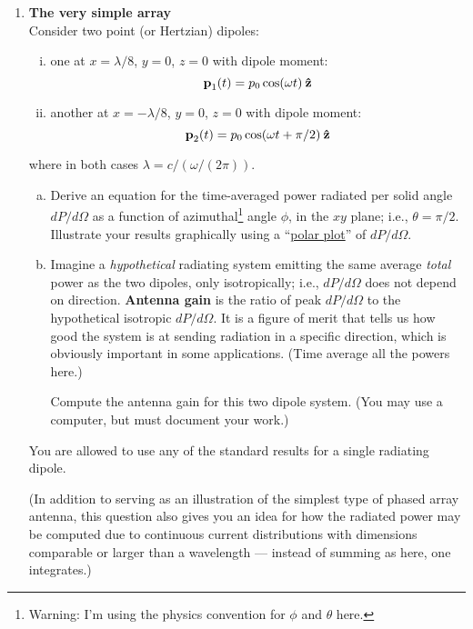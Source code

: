 \documentclass[12pt,geometry,width=8in]{article}
\begin{document}
\begin{enumerate}[(1),topsep=0pt,itemsep=0ex,partopsep=1ex,parsep=1ex]
\item \textbf{The very simple array}\\
Consider two point (or Hertzian) dipoles:
\begin{enumerate}[(i)]
\item one at $x=\lambda/8$, $y=0$, $z=0$ with dipole moment:
\begin{equation}
\boldsymbol{\mathbf{p}}_1(t) = p_0 \cos (\omega t) \: \boldsymbol{\mathbf{\hat{z}}}
\end{equation}
\item another at $x=-\lambda/8$, $y=0$, $z=0$ with dipole moment:
\begin{equation}
\boldsymbol{\mathbf{p}}_2(t) = p_0 \cos (\omega t + \pi/2) \: \boldsymbol{\mathbf{\hat{z}}}
\end{equation}
\end{enumerate}
where in both cases $\lambda = c/(\omega / (2\pi))$.

\begin{enumerate}[(a)]
\item Derive an equation for the time-averaged power radiated per solid angle $dP/d\Omega$ as a function of azimuthal\footnote{Warning: I'm using the physics convention for $\phi$ and $\theta$ here.} angle $\phi$, in the $xy$ plane;  i.e., $\theta =\pi/2$.  Illustrate your results graphically using a  ``\href{https://matplotlib.org/3.1.0/gallery/pie_and_polar_charts/polar_demo.html}{polar plot}'' of $dP/d\Omega$.
\item Imagine a {\em hypothetical} radiating system emitting the same average {\em total} power as the two dipoles, only isotropically; i.e., $dP/d\Omega$ does not depend on direction.  \textbf{Antenna gain} is the ratio of peak $dP/d\Omega$ to the hypothetical isotropic $dP/d\Omega$.  It is a figure of merit that tells us how good the system is at sending radiation in a specific direction, which is obviously important in some applications.  (Time average all the powers here.)

Compute the antenna gain for this two dipole system.  (You may use a computer, but must document your work.)
\end{enumerate}

You are allowed to use any of the standard results for a single radiating dipole.

(In addition to serving as an illustration of the simplest type of phased array antenna, this question also gives you an idea for how the radiated power may be computed due to continuous current distributions with dimensions comparable or larger than a wavelength --- instead of summing as here, one integrates.)


\end{enumerate}
\end{document}
